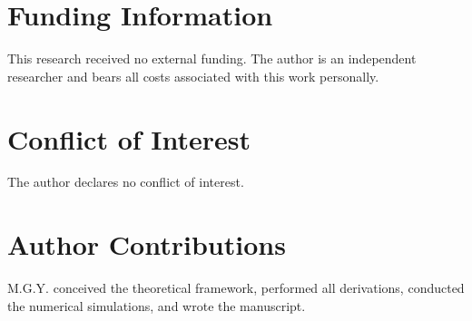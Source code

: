 \documentclass[11pt,a4paper]{article}
\begin{document}
\section*{Funding Information}
This research received no external funding. The author is an independent researcher and bears all costs associated with this work personally.

\section*{Conflict of Interest}
The author declares no conflict of interest.

\section*{Author Contributions}
M.G.Y. conceived the theoretical framework, performed all derivations, conducted the numerical simulations, and wrote the manuscript.
\end{document}
